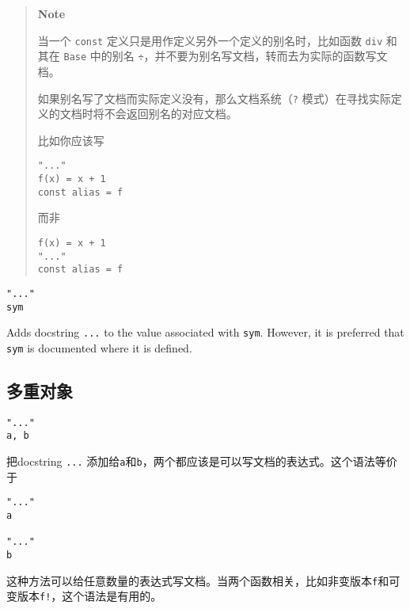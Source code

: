 \begin{quote}
\textbf{Note}

当一个 \texttt{const} 定义只是用作定义另外一个定义的别名时，比如函数 \texttt{div} 和其在 \texttt{Base} 中的别名 \texttt{÷}，并不要为别名写文档，转而去为实际的函数写文档。

如果别名写了文档而实际定义没有，那么文档系统（\texttt{?} 模式）在寻找实际定义的文档时将不会返回别名的对应文档。

比如你应该写


\begin{verbatim}
"..."
f(x) = x + 1
const alias = f
\end{verbatim}

而非


\begin{verbatim}
f(x) = x + 1
"..."
const alias = f
\end{verbatim}

\end{quote}



\begin{verbatim}
"..."
sym
\end{verbatim}



Adds docstring \texttt{{\textquotedbl}...{\textquotedbl}} to the value associated with \texttt{sym}. However, it is preferred that \texttt{sym} is documented where it is defined.



\hypertarget{6306013858572164490}{}


\subsection{多重对象}




\begin{verbatim}
"..."
a, b
\end{verbatim}



把docstring \texttt{{\textquotedbl}...{\textquotedbl}} 添加给\texttt{a}和\texttt{b}，两个都应该是可以写文档的表达式。这个语法等价于




\begin{verbatim}
"..."
a

"..."
b
\end{verbatim}



这种方法可以给任意数量的表达式写文档。当两个函数相关，比如非变版本\texttt{f}和可变版本\texttt{f!}，这个语法是有用的。



